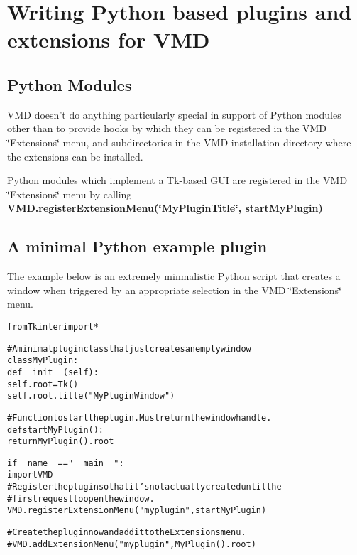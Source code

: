 \section{Writing Python based plugins and extensions for VMD}\label{pythonplugins}


\subsection*{Python Modules}
 VMD doesn't do anything particularly special in support of Python modules other than to provide hooks by which they can be  registered in the VMD \char`\"{}Extensions\char`\"{} menu, and subdirectories  in the VMD installation directory where the extensions can be installed.



 Python modules which implement a Tk-based GUI are registered in the  VMD \char`\"{}Extensions\char`\"{} menu by calling {\bf VMD.register\-Extension\-Menu(\char`\"{}My\-Plugin\-Title\char`\"{}, start\-My\-Plugin)}

\subsection*{A minimal Python example plugin}
 

 The example below is an extremely minmalistic Python script that creates a window when triggered by an appropriate selection in the VMD \char`\"{}Extensions\char`\"{} menu.

\small\begin{alltt}
from Tkinter import *

# A minimal plugin class that just creates an empty window
class MyPlugin:
  def __init__(self):
    self.root = Tk()
    self.root.title("My Plugin Window")

# Function to start the plugin.  Must return the window handle.
def startMyPlugin():
  return MyPlugin().root

if __name__=="__main__":
  import VMD
  # Register the plugin so that it's not actually created until the
  # first request to open the window.
  VMD.registerExtensionMenu("myplugin", startMyPlugin)

  # Create the plugin now and add it to the Extensions menu.
  # VMD.addExtensionMenu("myplugin", MyPlugin().root)
\end{alltt}\normalsize 



